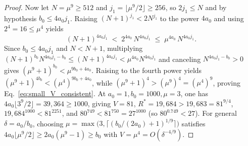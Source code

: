 \documentclass[11pt,a4paper]{article}
\theoremstyle{plain}
\theoremstyle{definition}
\theoremstyle{remark}
\begin{document}
\begin{proof}
Now let $N = \mu^9 \ge 512$ and $j_1 = \lfloor \mu^9 / 2 \rfloor \ge 256$, so $2 j_1 \le N$ and by hypothesis $b_0 \le 4 a_0 j_1$. Raising $(N + 1)^{j_1} < 2 N^{j_1}$ to the power $4 a_0$ and using $2^4 = 16 \le \mu^4$ yields
\begin{equation}
    (N + 1)^{4 a_0 j_1} \;<\; 2^{4 a_0}\,N^{4 a_0 j_1} \;\le\; \mu^{4 a_0}\,N^{4 a_0 j_1} .
    \label{eq:small_V_step}
\end{equation}
Since $b_0 \le 4 a_0 j_1$ and $N < N + 1$, multiplying $(N + 1)^{b_0} N^{4 a_0 j_1 - b_0} \le (N + 1)^{4 a_0 j_1} < \mu^{4 a_0} N^{4 a_0 j_1}$ and canceling $N^{4 a_0 j_1 - b_0} > 0$ gives $(\mu^9 + 1)^{b_0} < \mu^{9 b_0 + 4 a_0}$. Raising to the fourth power yields $(\mu^9 + 1)^{4 b_0} < (\mu^4)^{9 b_0 + 4 a_0}$, while $(\mu^9 + 1)^4 > (\mu^9)^4 = (\mu^4)^9$, proving Eq.~\eqref{eq:small_V_consistent}. At $a_0 = 1, b_0 = 1000, \mu = 3$, one has $4 a_0 \lfloor 3^9/2\rfloor = 39{,}364 \ge 1000$, giving $V = 81$, $R^* = 19{,}684 > 19{,}683 = 81^{9/4}$, $19{,}684^{1000} < 81^{2251}$, and $80^{749} < 81^{750} = 27^{1000}$ (so $80^{0.749} < 27$). For general $\delta = a_0/b_0$, choosing $\mu = \max\bigl(3, \lceil (b_0/(2 a_0) + 1)^{1/9}\rceil\bigr)$ satisfies $4 a_0 \lfloor \mu^9/2 \rfloor \ge 2 a_0 (\mu^9 - 1) \ge b_0$ with $V = \mu^4 = O(\delta^{-4/9})$.
\end{proof}
\end{document}
